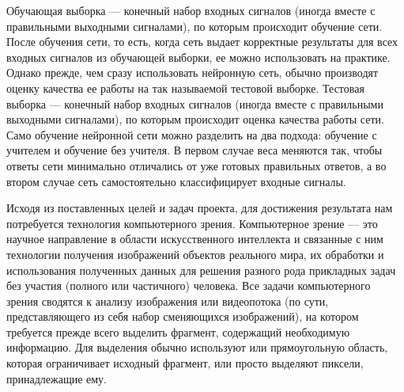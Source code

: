     Обучающая выборка — конечный набор входных сигналов (иногда вместе с правильными выходными сигналами), по которым происходит обучение сети. После обучения сети, то есть, когда сеть выдает корректные результаты для всех входных сигналов из обучающей выборки, ее можно использовать на практике. Однако прежде, чем сразу использовать нейронную сеть, обычно производят оценку качества ее работы на так называемой тестовой выборке. Тестовая выборка — конечный набор входных сигналов (иногда вместе с правильными выходными сигналами), по которым происходит оценка качества работы сети. Само обучение нейронной сети можно разделить на два подхода: обучение с учителем и обучение без учителя. В первом случае веса меняются так, чтобы ответы сети минимально отличались от уже готовых правильных ответов, а во втором случае сеть самостоятельно классифицирует входные сигналы.

    Исходя из поставленных целей и задач проекта, для достижения результата нам потребуется технология компьютерного зрения. Компьютерное зрение — это научное направление в области искусственного интеллекта и связанные с ним технологии получения изображений объектов реального мира, их обработки и использования полученных данных для решения разного рода прикладных задач без участия (полного или частичного) человека. Все задачи компьютерного зрения сводятся к анализу изображения или видеопотока (по сути, представляющего из себя набор сменяющихся изображений), на котором требуется прежде всего выделить фрагмент, содержащий необходимую информацию. Для выделения обычно используют или прямоугольную область, которая ограничивает исходный фрагмент, или просто выделяют пиксели, принадлежащие ему.

